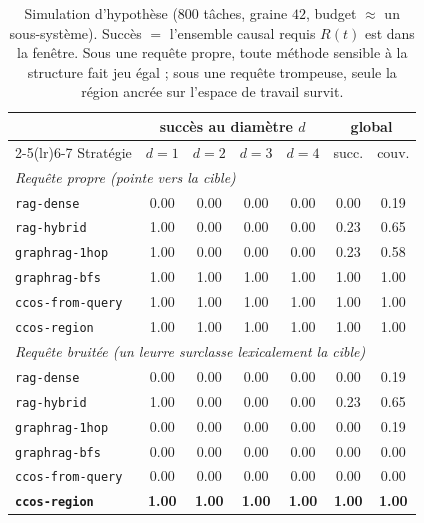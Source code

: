 \documentclass[11pt]{article}
\newcommand{\code}[1]{\texttt{#1}}
\begin{document}
\begin{table}[h]
\centering
\begin{tabular}{lcccccc}
\toprule
& \multicolumn{4}{c}{succès au diamètre $d$} & \multicolumn{2}{c}{global} \\
\cmidrule(lr){2-5}\cmidrule(lr){6-7}
Stratégie & $d{=}1$ & $d{=}2$ & $d{=}3$ & $d{=}4$ & succ. & couv. \\
\midrule
\multicolumn{7}{l}{\emph{Requête propre (pointe vers la cible)}}\\
\code{rag-dense}      & 0.00 & 0.00 & 0.00 & 0.00 & 0.00 & 0.19 \\
\code{rag-hybrid}     & 1.00 & 0.00 & 0.00 & 0.00 & 0.23 & 0.65 \\
\code{graphrag-1hop}  & 1.00 & 0.00 & 0.00 & 0.00 & 0.23 & 0.58 \\
\code{graphrag-bfs}   & 1.00 & 1.00 & 1.00 & 1.00 & 1.00 & 1.00 \\
\code{ccos-from-query}& 1.00 & 1.00 & 1.00 & 1.00 & 1.00 & 1.00 \\
\code{ccos-region}    & 1.00 & 1.00 & 1.00 & 1.00 & 1.00 & 1.00 \\
\midrule
\multicolumn{7}{l}{\emph{Requête bruitée (un leurre surclasse lexicalement la cible)}}\\
\code{rag-dense}      & 0.00 & 0.00 & 0.00 & 0.00 & 0.00 & 0.19 \\
\code{rag-hybrid}     & 1.00 & 0.00 & 0.00 & 0.00 & 0.23 & 0.65 \\
\code{graphrag-1hop}  & 0.00 & 0.00 & 0.00 & 0.00 & 0.00 & 0.19 \\
\code{graphrag-bfs}   & 0.00 & 0.00 & 0.00 & 0.00 & 0.00 & 0.00 \\
\code{ccos-from-query}& 0.00 & 0.00 & 0.00 & 0.00 & 0.00 & 0.00 \\
\textbf{\code{ccos-region}} & \textbf{1.00} & \textbf{1.00} & \textbf{1.00} & \textbf{1.00} & \textbf{1.00} & \textbf{1.00} \\
\bottomrule
\end{tabular}
\caption{Simulation d'hypothèse ($800$ tâches, graine $42$, budget $\approx$ un
sous-système). Succès $=$ l'ensemble causal requis $R(t)$ est dans la fenêtre. Sous
une requête propre, toute méthode sensible à la structure fait jeu égal ; sous une
requête trompeuse, seule la région ancrée sur l'espace de travail survit.}
\label{tab:sim}
\end{table}
\end{document}
